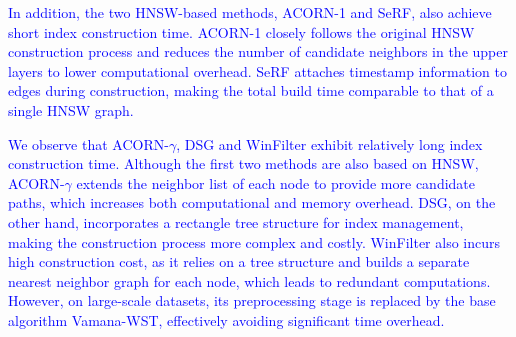\documentclass[sigconf, nonacm]{acmart}
\begin{document}
{\textcolor{blue}{In addition, the two HNSW-based methods, ACORN-1 and SeRF, also achieve short index construction time. ACORN-1 closely follows the original HNSW construction process and reduces the number of candidate neighbors in the upper layers to lower computational overhead. SeRF attaches timestamp information to edges during construction, making the total build time comparable to that of a single HNSW graph.
	}

\textcolor{blue}{We observe that ACORN-\(\gamma\), DSG and WinFilter exhibit relatively long index construction time. Although the first two methods are also based on HNSW, ACORN-\(\gamma\) extends the neighbor list of each node to provide more candidate paths, which increases both computational and memory overhead. DSG, on the other hand, incorporates a rectangle tree structure for index management, making the construction process more complex and costly. 
WinFilter also incurs high construction cost, as it relies on a tree structure and builds a separate nearest neighbor graph for each node, which leads to redundant computations. However, on large-scale datasets, its preprocessing stage is replaced by the base algorithm Vamana-WST, effectively avoiding significant time overhead.}
%	
	
}
\end{document}
